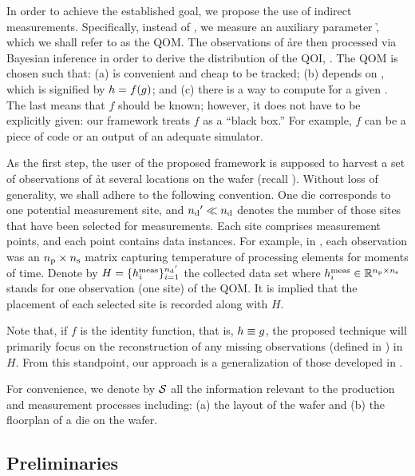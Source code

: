In order to achieve the established goal, we propose the use of indirect
measurements. Specifically, instead of \g, we measure an auxiliary parameter \h,
which we shall refer to as the \ac{QOM}. The observations of \h are then
processed via Bayesian inference in order to derive the distribution of the
\ac{QOI}, \g. The \ac{QOM} is chosen such that: (a) \h is convenient and cheap
to be tracked; (b) \h depends on \g, which is signified by $h = f(g)$; and (c)
there is a way to compute \h for a given \g. The last means that $f$ should be
known; however, it does not have to be explicitly given: our framework treats
$f$ as a ``black box.'' For example, $f$ can be a piece of code or an output of
an adequate simulator.

As the first step, the user of the proposed framework is supposed to harvest a
set of observations of \h at several locations on the wafer (recall
). Without loss of generality, we shall adhere to the following
convention. One die corresponds to one potential measurement site, and ${n_\mathrm{d}}' \ll
{n_\mathrm{d}}$ denotes the number of those sites that have been selected for measurements.
Each site comprises \np measurement points, and each point contains \ns data
instances. For example, in , each observation was an ${n_\mathrm{p}}
\times {n_\mathrm{s}}$ matrix capturing temperature of \np processing elements for \ns
moments of time. Denote by $H = \{ h_i^{\mathrm{meas}} \}_{i = 1}^{{n_\mathrm{d}}'}$ the
collected data set where $h_i^{\mathrm{meas}} \in \mathbb{R}^{{n_\mathrm{p}} \times {n_\mathrm{s}}}$ stands for
one observation (one site) of the \ac{QOM}. It is implied that the placement of
each selected site is recorded along with $H$.

Note that, if $f$ is the identity function, that is, $h \equiv g$, the
proposed technique will primarily focus on the reconstruction of any missing
observations (defined in ) in $H$. From this
standpoint, our approach is a generalization of those developed in
\cite{zhang2010, reda2009}.

For convenience, we denote by $\mathcal{S}$ all the information relevant to the
production and measurement processes including: (a) the layout of the wafer and
(b) the floorplan of a die on the wafer.

\subsection{Preliminaries}

